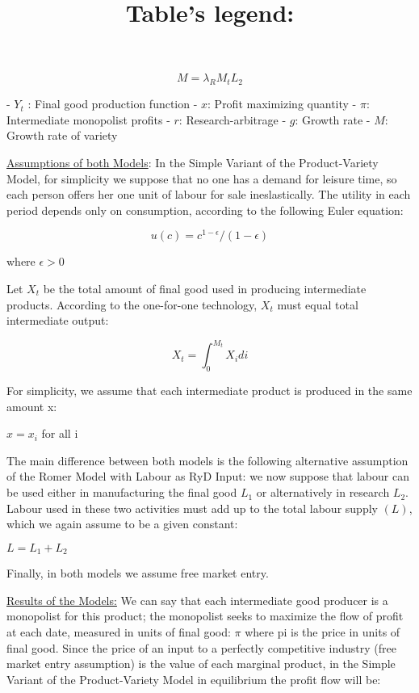 \documentclass{article}
\begin{document}
\begin{equation}
M = \lambda_{R} M_{t} L_{2}
\end{equation}

\title{Table's legend:}

- $Y_{t}$ : Final good production function
- $x$: Profit maximizing quantity
- $\pi$: Intermediate monopolist profits
- $r$: Research-arbitrage
- $g$: Growth rate
- $M$: Growth rate of variety

\underline {Assumptions of both Models}:
In the Simple Variant of the Product-Variety Model, for simplicity we suppose that no one has a demand for leisure time, so each person offers her one unit of labour for sale ineslastically. The utility in each period depends only on consumption, according to the following Euler equation:

\begin{equation} 
 u(c)= c^{1-\epsilon}/(1-\epsilon)
 \end{equation}

where $\epsilon>0$

Let $X_{t}$ be the total amount of final good used in producing intermediate products. According to the one-for-one technology,  $X_{t}$ must equal total intermediate output: 

\begin{equation} 
X_{t} = \int_{0}^{M_{t}} X_{i} di
 \end{equation}

For simplicity, we assume that each intermediate product is produced in the same amount x: 

$x = x_{i}$ for all i

\begin{paragraph}The main difference between both models is the following alternative assumption of the Romer Model with Labour as RyD Input: we now suppose that labour can be used either in manufacturing the final good  $L_{1}$ or alternatively in research $L_{2}$. Labour used in these two activities must add up to the total labour supply $(L)$, which we again assume to be a given constant:
 \end{paragraph}
 $L= L_{1}+ L_{2}$

Finally, in both models we assume free market entry.

\underline {Results of the Models:}
We can say that each intermediate good producer is a monopolist for this product; the monopolist seeks to maximize the flow of profit at each date, measured in units of final good:
$\pi$
		where pi is the price in units of final good.
Since the price of an input to a perfectly competitive industry (free market entry assumption) is the value of each marginal product, in the Simple Variant of the Product-Variety Model in equilibrium the profit flow will be:
 
\end{document}
